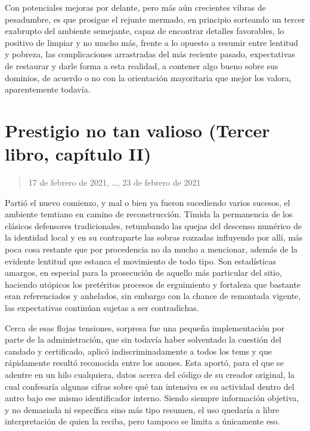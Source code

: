 \documentclass[
]{book}
\begin{document}
Con potenciales mejoras por delante, pero más aún crecientes vibras de pesadumbre, es que prosigue el rejunte mermado, en principio sorteando un tercer exabrupto del ambiente semejante, capaz de encontrar detalles favorables, lo positivo de limpiar y no mucho más, frente a lo opuesto a resumir entre lentitud y pobreza, las complicaciones arrastradas del más reciente pasado, expectativas de restaurar y darle forma a esta realidad, a contener algo bueno sobre sus dominios, de acuerdo o no con la orientación mayoritaria que mejor los valora, aparentemente todavía.

\hypertarget{prestigio-no-tan-valioso-tercer-libro-capuxedtulo-ii}{%
\section{Prestigio no tan valioso (Tercer libro, capítulo II)}\label{prestigio-no-tan-valioso-tercer-libro-capuxedtulo-ii}}

\begin{quote}
17 de febrero de 2021, \ldots, 23 de febrero de 2021
\end{quote}

Partió el nuevo comienzo, y mal o bien ya fueron sucediendo varios sucesos, el ambiente temtiano en camino de reconstrucción. Tímida la permanencia de los clásicos defensores tradicionales, retumbando las quejas del descenso numérico de la identidad local y en su contraparte las sobras rozzadas influyendo por allí, más poca cosa restante que por procedencia no da mucho a mencionar, además de la evidente lentitud que estanca el movimiento de todo tipo. Son estadísticas amargos, en especial para la prosecución de aquello más particular del sitio, haciendo utópicos los pretéritos procesos de erguimiento y fortaleza que bastante eran referenciados y anhelados, sin embargo con la chance de remontada vigente, las expectativas continúan sujetas a ser contradichas.

Cerca de esas flojas tensiones, sorpresa fue una pequeña implementación por parte de la administración, que sin todavía haber solventado la cuestión del candado y certificado, aplicó indiscriminadamente a todos los tems y que rápidamente resultó reconocida entre los anones. Esta aportó, para el que se adentre en un hilo cualquiera, datos acerca del código de su creador original, la cual confesaría algunas cifras sobre qué tan intensiva es su actividad dentro del antro bajo ese mismo identificador interno. Siendo siempre información objetiva, y no demasiada ni específica sino más tipo resumen, el uso quedaría a libre interpretación de quien la reciba, pero tampoco se limita a únicamente eso.
\end{document}
